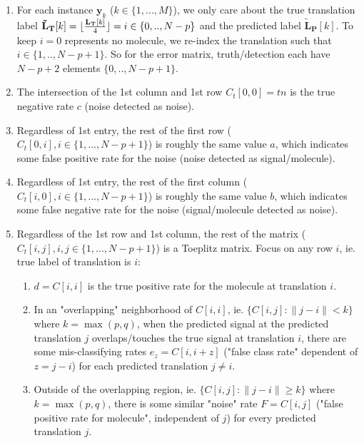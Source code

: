 \documentclass[11pt]{article}
\DeclarePairedDelimiter{\floor}{\lfloor}{\rfloor}
\newcommand{\by}{\boldsymbol{y}}
\begin{document}
        \begin{enumerate}
            \item For each instance $\by_k$ ($k \in \{1,...,M\}$), we only care about the true translation label $\mathbf{\tilde{L}_T}[k] = \floor{\frac{\mathbf{L_T}[k]}{4}} = i \in {\{0,..,N-p\}}$ and the predicted label $\mathbf{\tilde{L}_P}[k]$. To keep $i=0$ represents no molecule, we re-index the translation such that $i \in {\{1,..,N-p+1\}}$. So for the error matrix, truth/detection each have $N-p+2$ elements ${\{0,..,N-p+1\}}$.
            
            \item The intersection of the 1st column and 1st row $C_{t}[0,0]=tn$ is the true negative rate $c$ (noise detected as noise). 
                \item Regardless of 1st entry, the rest of the first row ($C_{t}[0,i], i \in \{1,...,N-p+1\}$) is roughly the same value $a$, which indicates some false positive rate for the noise (noise detected as signal/molecule).
                \item Regardless of 1st entry, the rest of the first column ($C_{t}[i,0], i \in \{1,...,N-p+1\}$) is roughly the same value $b$, which indicates some false negative rate for the noise (signal/molecule detected as noise).
                \item Regardless of the 1st row and 1st column, the rest of the matrix ($C_{t}[i,j], i,j \in \{1,...,N-p+1\}$) is a Toeplitz matrix. Focus on any row $i$, ie. true label of translation is $i$: 
                \begin{enumerate}
                    \item $d=C[i,i]$ is the true positive rate for the molecule at translation $i$. 
                    \item In an "overlapping" neighborhood of $C[i,i]$, ie. $\{C[i,j]: \lVert j-i \rVert < k\}$ where $k=\max{(p,q)}$, when the predicted signal at the predicted translation $j$ overlaps/touches the true signal at translation $i$, there are some mis-classifying rates $e_{z}=C[i,i+z]$ ("false class rate" dependent of $z=j-i$) for each predicted translation $j \neq i$.
                    \item Outside of the overlapping region, ie. $\{C[i,j]: \lVert j-i \rVert \ge k\}$ where $k=\max{(p,q)}$, there is some similar "noise" rate $F=C[i,j]$ ("false positive rate for molecule", independent of $j$) for every predicted translation $j$.
                \end{enumerate}
            

\end{enumerate}
\end{document}

